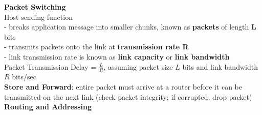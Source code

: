 \documentclass[10pt, a4paper]{article}
\newcommand{\highlight}[1]{{\color{red}\textbf{#1}}}
\begin{document}
\begin{multicols*}{3}
		\textbf{Packet Switching}\\
		Host sending function\\
		- breaks application message into smaller chunks, known as \highlight{packets} of length \highlight{L} bits\\
		- transmits packets onto the link at \highlight{transmission rate R}\\
		- link transmission rate is known as \highlight{link capacity} or \highlight{link bandwidth}\\
		
		Packet Transmission Delay = $\frac{L}{R}$, assuming packet size $L$ bits and link bandwidth $R$ bits/sec\\
		
		\highlight{Store and Forward}: entire packet must arrive at a router before it can be transmitted on the next link (check packet integrity; if corrupted, drop packet)\\
		
		\textbf{Routing and Addressing}\\
		
		
		
		
		
		
	\end{multicols*}
\end{document}
